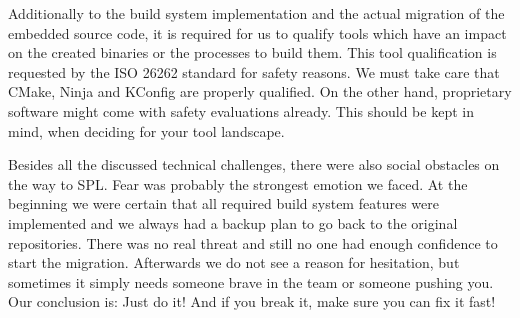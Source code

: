Additionally to the build system implementation and the actual migration of the
embedded source code, it is required for us to qualify tools which have an
impact on the created binaries or the processes to build them. This tool
qualification is requested by the ISO 26262 standard for safety reasons. We must
take care that CMake, Ninja and KConfig are properly qualified. On the other
hand, proprietary software might come with safety evaluations already. This
should be kept in mind, when deciding for your tool landscape.

Besides all the discussed technical challenges, there were also social obstacles
on the way to SPL. Fear was probably the strongest emotion we faced. At the
beginning we were certain that all required build system features were
implemented and we always had a backup plan to go back to the original
repositories. There was no real threat and still no one had enough confidence to
start the migration. Afterwards we do not see a reason for hesitation, but
sometimes it simply needs someone brave in the team or someone pushing you. Our
conclusion is: Just do it! And if you break it, make sure you can fix it fast!
